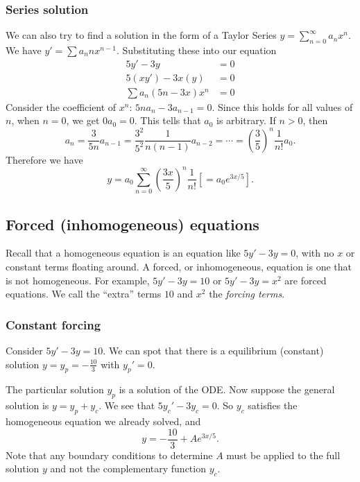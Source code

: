 \documentclass[a4paper]{article}
\begin{document}
\subsubsection*{Series solution}
We can also try to find a solution in the form of a Taylor Series $y = \sum\limits_{n=0}^\infty a_nx^n$. We have $y' = \sum a_nnx^{n-1}$. Substituting these into our equation
\begin{align*}
  5y' - 3y &= 0\\
  5(xy')  - 3x(y) &= 0\\
  \sum a_n(5n - 3x)x^n &= 0
\end{align*}
Consider the coefficient of $x^n$: $5n a_n - 3 a_{n-1} = 0$. Since this holds for all values of $n$, when $n = 0$, we get $0a_0 = 0$. This tells that $a_0$ is arbitrary. If $n>0$, then
\[
  a_n = \frac{3}{5n}a_{n-1} = \frac{3^2}{5^2}\frac{1}{n(n-1)}a_{n-2} = \cdots = \left(\frac{3}{5}\right)^n \frac{1}{n!}a_0.
\]
Therefore we have
\[
  y = a_0\sum_{n = 0}^\infty \left(\frac{3x}{5}\right)^n\frac{1}{n!} \left[= a_0 e^{3x/5}\right].
\]

\subsection{Forced (inhomogeneous) equations}
Recall that a homogeneous equation is an equation like $5y' - 3y = 0$, with no $x$ or constant terms floating around. A forced, or inhomogeneous, equation is one that is not homogeneous. For example, $5y' - 3y = 10$ or $5y' - 3y = x^2$ are forced equations. We call the ``extra'' terms $10$ and $x^2$ the \emph{forcing terms}.

\subsubsection{Constant forcing}

\begin{eg}
  Consider $5y' - 3y = 10$. We can spot that there is a equilibrium (constant) solution $y = y_p = -\frac{10}{3}$ with $y_p' = 0$.

  The particular solution $y_p$ is a solution of the ODE. Now suppose the general solution is $y = y_p + y_c$. We see that $5y_c' - 3y_c = 0$. So $y_c$ satisfies the homogeneous equation we already solved, and
  \[
    y = -\frac{10}{3} + Ae^{3x/5}.
  \]
  Note that any boundary conditions to determine $A$ must be applied to the full solution $y$ and not the complementary function $y_c$.
\end{eg}
\end{document}
